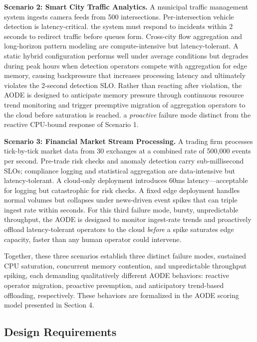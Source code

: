 \documentclass[preprint,review,12pt]{elsarticle}
\begin{document}
\textbf{Scenario 2: Smart City Traffic Analytics.} A municipal traffic management system ingests camera feeds from 500 intersections. Per-intersection vehicle detection is latency-critical. the system must respond to incidents within 2 seconds to redirect traffic before queues form. Cross-city flow aggregation and long-horizon pattern modeling are compute-intensive but latency-tolerant. A static hybrid configuration performs well under average conditions but degrades during peak hours when detection operators compete with aggregation for edge memory, causing backpressure that increases processing latency and ultimately violates the 2-second detection SLO. Rather than reacting after violation, the AODE is designed to anticipate memory pressure through continuous resource trend monitoring and trigger preemptive migration of aggregation operators to the cloud before saturation is reached. a \emph{proactive} failure mode distinct from the reactive CPU-bound response of Scenario 1.

\textbf{Scenario 3: Financial Market Stream Processing.} A trading firm processes tick-by-tick market data from 30 exchanges at a combined rate of 500,000 events per second. Pre-trade risk checks and anomaly detection carry sub-millisecond SLOs; compliance logging and statistical aggregation are data-intensive but latency-tolerant. A cloud-only deployment introduces 60ms latency—acceptable for logging but catastrophic for risk checks. A fixed edge deployment handles normal volumes but collapses under news-driven event spikes that can triple ingest rate within seconds. For this third failure mode, bursty, unpredictable throughput, the AODE is designed to monitor ingest-rate trends and proactively offload latency-tolerant operators to the cloud \emph{before} a spike saturates edge capacity, faster than any human operator could intervene.

Together, these three scenarios establish three distinct failure modes, sustained CPU saturation, concurrent memory contention, and unpredictable throughput spiking, each demanding qualitatively different AODE behaviors: reactive operator migration, proactive preemption, and anticipatory trend-based offloading, respectively. These behaviors are formalized in the AODE scoring model presented in Section 4.

\subsection{Design Requirements}\label{design-requirements}
\end{document}
